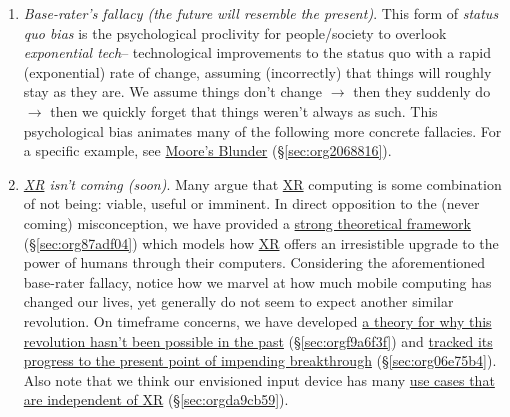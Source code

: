 \documentclass[logo,bsc,singlespacing,parskip]{infthesis}
\begin{document}
\begin{enumerate}
\item \emph{Base-rater's fallacy (the future will resemble the present)}.
This form of \emph{status quo bias} is the psychological proclivity for people/society to overlook \emph{exponential tech}-- technological improvements to the status quo with a rapid (exponential) rate of change, assuming (incorrectly) that things will roughly stay as they are.
We assume things don't change \(\rightarrow\) then they suddenly do \(\rightarrow\) then we quickly forget that things weren't always as such.
This psychological bias animates many of the following more concrete fallacies.
For a specific example, see \hyperref[sec:org2068816]{Moore's Blunder} (\S \ref{sec:org2068816}).

\item \emph{\hyperref[org88b0f70]{XR} isn't coming (soon)}.
Many argue that \hyperref[org88b0f70]{XR} computing is some combination of not being: viable, useful or imminent.
In direct opposition to the (never coming) misconception, we have provided a \hyperref[sec:org87adf04]{strong theoretical framework} (\S \ref{sec:org87adf04}) which models how \hyperref[org88b0f70]{XR} offers an irresistible upgrade to the power of humans through their computers.
Considering the aforementioned base-rater fallacy, notice how we marvel at how much mobile computing has changed our lives, yet generally do not seem to expect another similar revolution.
On timeframe concerns, we have developed \hyperref[sec:orgf9a6f3f]{a theory for why this revolution hasn't been possible in the past} (\S \ref{sec:orgf9a6f3f}) and \hyperref[sec:org06e75b4]{tracked its progress to the present point of impending breakthrough} (\S \ref{sec:org06e75b4}).
Also note that we think our envisioned input device has many \hyperref[sec:orgda9cb59]{use cases that are independent of XR} (\S \ref{sec:orgda9cb59}).


\end{enumerate}
\end{document}
